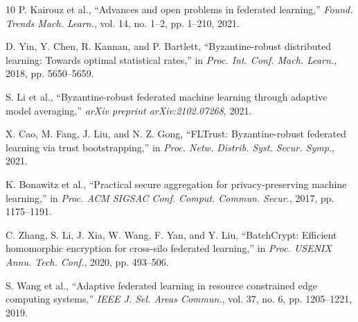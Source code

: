 \documentclass[conference]{IEEEtran}
\begin{document}
\begin{thebibliography}{10}
P. Kairouz et al., ``Advances and open problems in federated learning,'' \textit{Found. Trends Mach. Learn.}, vol. 14, no. 1--2, pp. 1--210, 2021.

D. Yin, Y. Chen, R. Kannan, and P. Bartlett, ``Byzantine-robust distributed learning: Towards optimal statistical rates,'' in \textit{Proc. Int. Conf. Mach. Learn.}, 2018, pp. 5650--5659.

S. Li et al., ``Byzantine-robust federated machine learning through adaptive model averaging,'' \textit{arXiv preprint arXiv:2102.07268}, 2021.

X. Cao, M. Fang, J. Liu, and N. Z. Gong, ``FLTrust: Byzantine-robust federated learning via trust bootstrapping,'' in \textit{Proc. Netw. Distrib. Syst. Secur. Symp.}, 2021.

K. Bonawitz et al., ``Practical secure aggregation for privacy-preserving machine learning,'' in \textit{Proc. ACM SIGSAC Conf. Comput. Commun. Secur.}, 2017, pp. 1175--1191.

C. Zhang, S. Li, J. Xia, W. Wang, F. Yan, and Y. Liu, ``BatchCrypt: Efficient homomorphic encryption for cross-silo federated learning,'' in \textit{Proc. USENIX Annu. Tech. Conf.}, 2020, pp. 493--506.

S. Wang et al., ``Adaptive federated learning in resource constrained edge computing systems,'' \textit{IEEE J. Sel. Areas Commun.}, vol. 37, no. 6, pp. 1205--1221, 2019.

\end{thebibliography}
\end{document}
